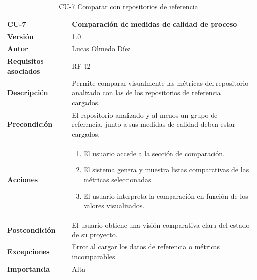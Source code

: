 \clearpage
\begin{table}[p]
    \centering
    \begin{tabularx}{\linewidth}{ p{} p{} }
        \toprule
        \textbf{CU-7} & Comparación de medidas de calidad de proceso \\
        \midrule
        \textbf{Versión} & 1.0 \\
        \textbf{Autor} & Lucas Olmedo Díez \\
        \textbf{Requisitos asociados} & RF-12 \\
        \textbf{Descripción} & Permite comparar visualmente las métricas del repositorio analizado con las de los repositorios de referencia cargados. \\
        \textbf{Precondición} & El repositorio analizado y al menos un grupo de referencia, junto a sus medidas de calidad deben estar cargados. \\
        \textbf{Acciones} &
        \begin{enumerate}
            \def\labelenumi{\arabic{enumi}.}
            \tightlist
            \item El usuario accede a la sección de comparación.
            \item El sistema genera y muestra listas comparativas de las métricas seleccionadas.
            \item El usuario interpreta la comparación en función de los valores visualizados.
        \end{enumerate}\\
        \textbf{Postcondición} & El usuario obtiene una visión comparativa clara del estado de su proyecto. \\
        \textbf{Excepciones} & Error al cargar los datos de referencia o métricas incomparables. \\
        \textbf{Importancia} & Alta \\
        \bottomrule
    \end{tabularx}
    \caption{CU-7 Comparar con repositorios de referencia}
\end{table}

